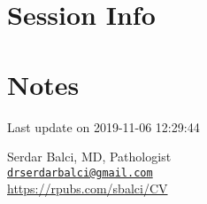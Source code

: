 \documentclass[]{article}
\begin{document}
\pagebreak

\hypertarget{session-info}{%
\section{Session Info}\label{session-info}}

\pagebreak

\hypertarget{notes}{%
\section{Notes}\label{notes}}

Last update on 2019-11-06 12:29:44

Serdar Balci, MD, Pathologist\\
\href{mailto:drserdarbalci@gmail.com}{\nolinkurl{drserdarbalci@gmail.com}}\\
\url{https://rpubs.com/sbalci/CV}

\pagebreak

\newpage
\end{document}
